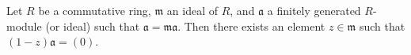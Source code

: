 Let $R$ be a commutative ring, $\mathfrak{m}$ an ideal of $R$, and $\mathfrak{a}$ a finitely generated $R$-module (or ideal) such that $\mathfrak{a} = \mathfrak{m}\mathfrak{a}$. Then there exists an element $z \in \mathfrak{m}$ such that $(1 - z)\mathfrak{a} = (0)$.
